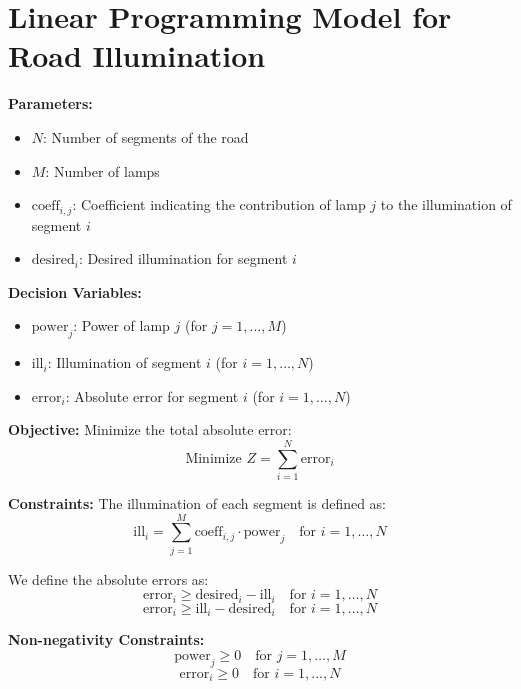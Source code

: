 \documentclass{article}
\begin{document}
\section*{Linear Programming Model for Road Illumination}

\textbf{Parameters:}
\begin{itemize}
    \item \( N \): Number of segments of the road
    \item \( M \): Number of lamps
    \item \( \text{coeff}_{i,j} \): Coefficient indicating the contribution of lamp \( j \) to the illumination of segment \( i \)
    \item \( \text{desired}_i \): Desired illumination for segment \( i \)
\end{itemize}

\textbf{Decision Variables:}
\begin{itemize}
    \item \( \text{power}_j \): Power of lamp \( j \) (for \( j = 1, \ldots, M \))
    \item \( \text{ill}_i \): Illumination of segment \( i \) (for \( i = 1, \ldots, N \))
    \item \( \text{error}_i \): Absolute error for segment \( i \) (for \( i = 1, \ldots, N \))
\end{itemize}

\textbf{Objective:}
Minimize the total absolute error:
\[
\text{Minimize } Z = \sum_{i=1}^{N} \text{error}_i
\]

\textbf{Constraints:}
The illumination of each segment is defined as:
\[
\text{ill}_i = \sum_{j=1}^{M} \text{coeff}_{i,j} \cdot \text{power}_j \quad \text{for } i = 1, \ldots, N
\]

We define the absolute errors as:
\[
\text{error}_i \geq \text{desired}_i - \text{ill}_i \quad \text{for } i = 1, \ldots, N
\]
\[
\text{error}_i \geq \text{ill}_i - \text{desired}_i \quad \text{for } i = 1, \ldots, N
\]

\textbf{Non-negativity Constraints:}
\[
\text{power}_j \geq 0 \quad \text{for } j = 1, \ldots, M
\]
\[
\text{error}_i \geq 0 \quad \text{for } i = 1, \ldots, N
\]
\end{document}
